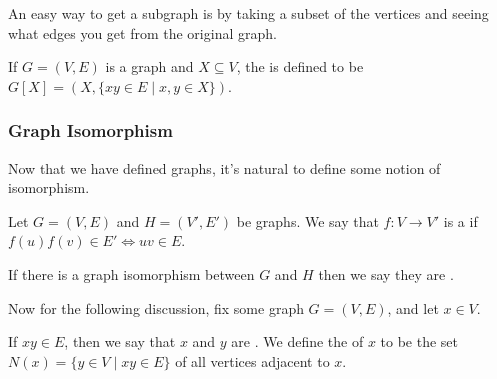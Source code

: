 An easy way to get a subgraph is by taking a subset of the vertices and seeing what edges you get from the original graph.

\begin{definition}
	If $G = (V, E)$ is a graph and $X \subseteq V$, the  is defined to be $G[X] = (X, \{xy \in E \mid x, y \in X\})$.
\end{definition}

\subsubsection{Graph Isomorphism}

Now that we have defined graphs, it's natural to define some notion of isomorphism.

\begin{definition}
	Let $G = (V, E)$ and $H = (V', E')$ be graphs. We say that $f : V \rightarrow V'$ is a  if $f(u)f(v) \in E' \iff uv \in E$. 

	If there is a graph isomorphism between $G$ and $H$ then we say they are .
\end{definition}

Now for the following discussion, fix some graph $G = (V, E)$, and let $x \in V$. 

\begin{definition}[Neighbourhood]
	If $xy \in E$, then we say that $x$ and $y$ are .
	We define the  of $x$ to be the set $N(x) = \{ y \in V \mid xy \in E\}$ of all vertices adjacent to $x$.
\end{definition}

